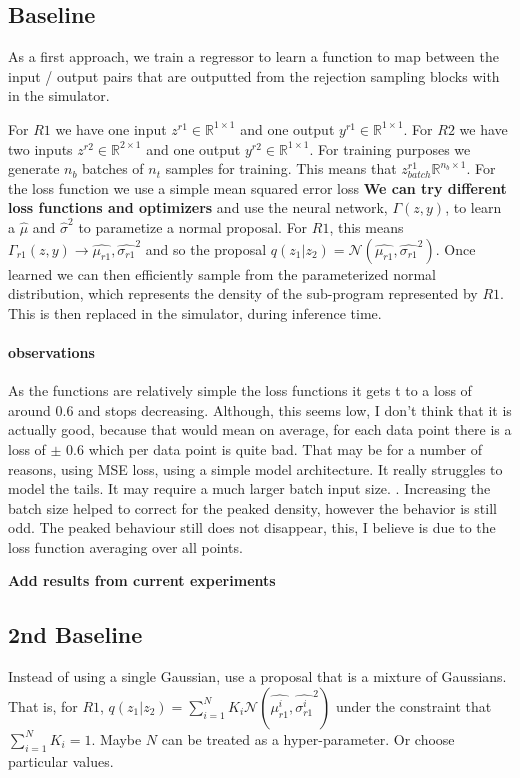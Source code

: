 \documentclass{article}
\begin{document}
\subsection{Baseline}
As a first approach, we train a regressor to learn a function to map
between the input / output pairs that are outputted from the rejection
sampling blocks with in the simulator. 

For $R1$ we have one input $z^{r1} \in \mathbb{R}^{1 \times 1}$ and one output $y^{r1} \in \mathbb{R}^{1 \times 1}$.
For $R2$ we have two inputs $z^{r2} \in \mathbb{R}^{2 \times 1}$ and one output $y^{r2} \in \mathbb{R}^{1 \times 1}$.
For training purposes we generate $n_{b}$ batches of $n_{t}$ samples for training. 
This means that $z^{r1}_{batch}\mathbb{R}^{n_{b} \times 1}$. 
For the loss function we use a simple mean squared error loss \textbf{We can try different loss 
functions and optimizers} and use the
neural network, $\Gamma(z, y)$, to learn a $\hat{\mu}$ and $\hat{\sigma}^{2}$ to parametize 
a normal proposal. For $R1$, this means $\Gamma_{r1}(z,y) \rightarrow \hat{\mu_{r1}},  \hat{\sigma_{r1}}^{2}$  
and so the proposal $q(z_{1} | z_{2}) = \mathcal{N}(\hat{\mu_{r1}},  \hat{\sigma_{r1}}^{2})$. 
Once learned we can then efficiently sample from the parameterized normal distribution, which
represents the density of the sub-program represented by $R1$. 
This is then replaced in the simulator, during inference time. 

\paragraph{observations} As the functions are relatively simple the loss functions it gets t
to a loss of around 0.6 and stops decreasing. Although, this seems low, I don't think that it is
actually good, because that would mean on average, for each data point there is a loss of $\pm$ 0.6
which per data point is quite bad. That may be for a number of reasons, using MSE loss, using a simple
model architecture. It really struggles to model the tails. It may require a much larger batch input size. 
. Increasing the batch size helped to correct for the peaked density, however the behavior is still odd.
The peaked behaviour still does not disappear, this, I believe is due to the loss function averaging 
over all points.



 \textbf{Add results from current experiments}


\subsection{2nd Baseline}
Instead of using a single Gaussian, use a proposal that is a mixture of Gaussians. 
That is, for $R1$,   $q(z_{1} | z_{2}) = \sum^{N}_{i=1}K_{i}\mathcal{N}(\hat{\mu^{i}_{r1}},  \hat{\sigma^{i}_{r1}}^{2})$
under the constraint that $\sum^{N}_{i=1}K_{i} = 1$. Maybe $N$ can be treated as a hyper-parameter. 
Or choose particular values.
\end{document}
